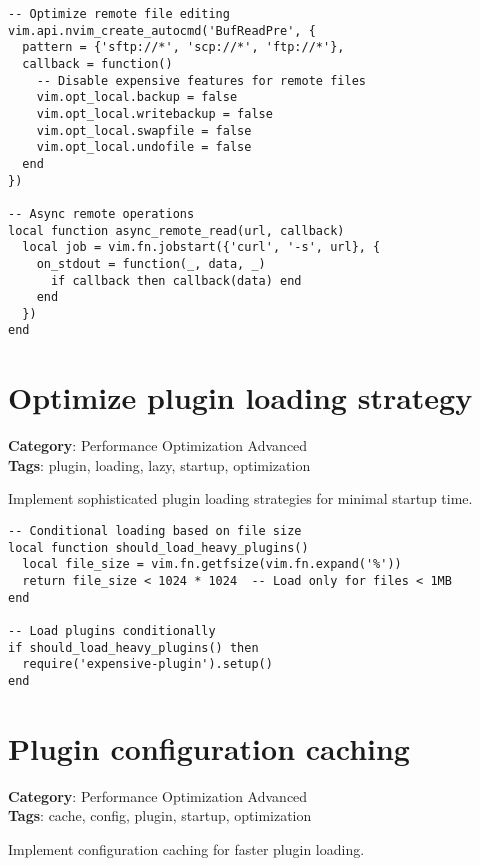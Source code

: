{{{{{{{{{{\begin{Exa*}{}
\begin{Verbatim}[fontsize=\footnotesize, breaklines, breakanywhere]
-- Optimize remote file editing
vim.api.nvim_create_autocmd('BufReadPre', {
  pattern = {'sftp://*', 'scp://*', 'ftp://*'},
  callback = function()
    -- Disable expensive features for remote files
    vim.opt_local.backup = false
    vim.opt_local.writebackup = false
    vim.opt_local.swapfile = false
    vim.opt_local.undofile = false
  end
})

-- Async remote operations
local function async_remote_read(url, callback)
  local job = vim.fn.jobstart({'curl', '-s', url}, {
    on_stdout = function(_, data, _)
      if callback then callback(data) end
    end
  })
end
\end{Verbatim}
\end{Exa*}

\section{Optimize plugin loading strategy}

\textbf{Category}: Performance Optimization Advanced\\ \textbf{Tags}: plugin, loading, lazy, startup, optimization
\vspace{0.5cm}

Implement sophisticated plugin loading strategies for minimal startup time.

\begin{Exa*}{}
\begin{Verbatim}[fontsize=\footnotesize, breaklines, breakanywhere]
-- Conditional loading based on file size
local function should_load_heavy_plugins()
  local file_size = vim.fn.getfsize(vim.fn.expand('%'))
  return file_size < 1024 * 1024  -- Load only for files < 1MB
end

-- Load plugins conditionally
if should_load_heavy_plugins() then
  require('expensive-plugin').setup()
end
\end{Verbatim}
\end{Exa*}

\section{Plugin configuration caching}

\textbf{Category}: Performance Optimization Advanced\\ \textbf{Tags}: cache, config, plugin, startup, optimization
\vspace{0.5cm}

Implement configuration caching for faster plugin loading.

}}}}}}}}}}
